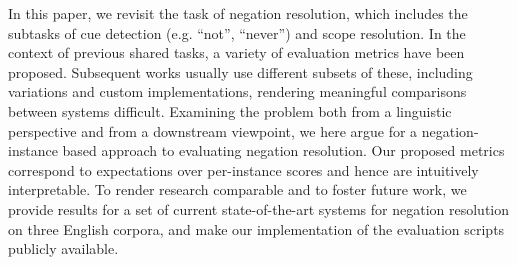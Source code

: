 In this paper, we revisit the task of negation resolution, which includes the subtasks of cue detection (e.g. ``not'', ``never'') and scope resolution. In the context of previous shared tasks, a variety of evaluation metrics have been proposed. Subsequent works usually use different subsets of these, including variations and custom implementations, rendering meaningful comparisons between systems difficult. Examining the problem both from a linguistic perspective and from a downstream viewpoint, we here argue for a negation-instance based approach to evaluating negation resolution. Our proposed metrics correspond to expectations over per-instance scores and hence are intuitively interpretable. To render research comparable and to foster future work, we provide results for a set of current state-of-the-art systems for negation resolution on three English corpora, and make our implementation of the evaluation scripts publicly available.
